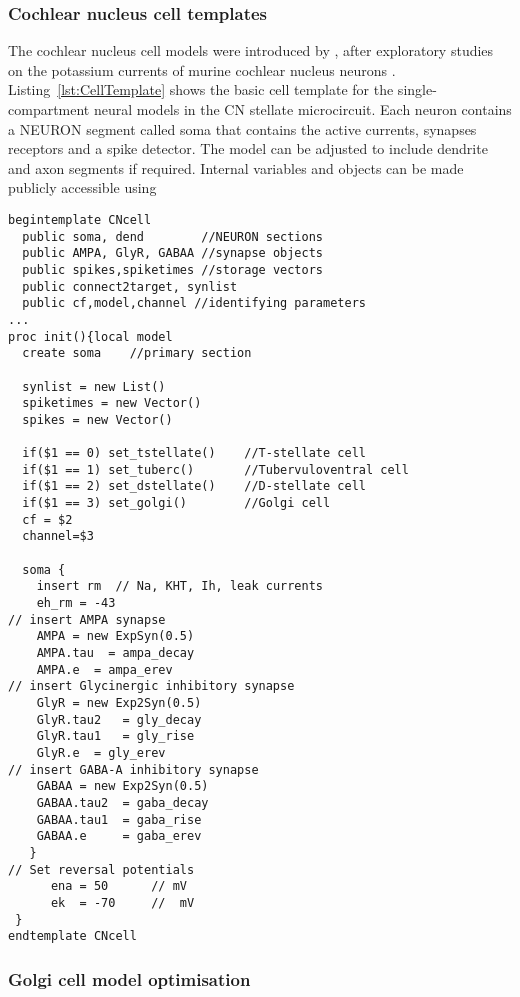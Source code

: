 \subsubsection[CN cells]{Cochlear nucleus cell templates}

The cochlear nucleus cell models were introduced by \citet{RothmanManis:2003b},
after exploratory studies on the potassium currents of murine cochlear nucleus
neurons \citep{RothmanManis:2003,RothmanManis:2003a}.
Listing~\ref{lst:CellTemplate} shows the basic cell template for the
single-compartment neural models in the CN stellate microcircuit.  Each neuron
contains a NEURON segment called soma that contains the active currents,
synapses receptors and a spike detector. The model can be adjusted to include
dendrite and axon segments if required. Internal variables and objects can be made publicly accessible using  

\begin{lstlisting}[label=lst:CellTemplate,caption=Rothman and Manis cochlear
  nucleus cell template (in CNcell.tem)]
begintemplate CNcell
  public soma, dend        //NEURON sections
  public AMPA, GlyR, GABAA //synapse objects 
  public spikes,spiketimes //storage vectors
  public connect2target, synlist 
  public cf,model,channel //identifying parameters
...
proc init(){local model
  create soma    //primary section

  synlist = new List()
  spiketimes = new Vector()
  spikes = new Vector()
    
  if($1 == 0) set_tstellate()    //T-stellate cell
  if($1 == 1) set_tuberc()       //Tubervuloventral cell
  if($1 == 2) set_dstellate()    //D-stellate cell
  if($1 == 3) set_golgi()        //Golgi cell
  cf = $2
  channel=$3

  soma {
    insert rm  // Na, KHT, Ih, leak currents 
    eh_rm = -43 
// insert AMPA synapse 
    AMPA = new ExpSyn(0.5)
    AMPA.tau  = ampa_decay
    AMPA.e 	= ampa_erev
// insert Glycinergic inhibitory synapse 
    GlyR = new Exp2Syn(0.5)
    GlyR.tau2	= gly_decay
    GlyR.tau1	= gly_rise
    GlyR.e 	= gly_erev
// insert GABA-A inhibitory synapse 
    GABAA = new Exp2Syn(0.5)
    GABAA.tau2 	= gaba_decay
    GABAA.tau1 	= gaba_rise
    GABAA.e 	= gaba_erev
   }
// Set reversal potentials 
      ena = 50		// mV
      ek  = -70		//  mV
 }
endtemplate CNcell 

\end{lstlisting}



\subsubsection[Golgi model]{Golgi cell model optimisation}


